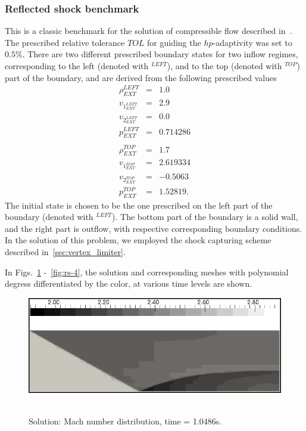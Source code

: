 \subsubsection{Reflected shock benchmark}
This is a classic benchmark for the solution of compressible flow described in~\cite{reflected}.
The prescribed relative tolerance $TOL$ for guiding the $hp$-adaptivity was set to $0.5\%$.
There are two different prescribed boundary states for two inflow regimes, corresponding to the left (denoted with $^{LEFT}$), and to the top (denoted with $^{TOP}$) part of the boundary, and are derived from the following prescribed values
\begin{eqnarray}
\rho_{EXT}^{LEFT} & = & 1.0 \\
v_{1_{EXT}^{LEFT}} & = & 2.9 \\
v_{2_{EXT}^{LEFT}} & = & 0.0 \\
p_{EXT}^{LEFT} & = & 0.714286 \\
\\
\rho_{EXT}^{TOP} & = & 1.7 \\
v_{1_{EXT}^{TOP}} & = & 2.619334 \\
v_{2_{EXT}^{TOP}} & = & -0.5063 \\
p_{EXT}^{TOP} & = & 1.52819.
\end{eqnarray}
The initial state is chosen to be the one prescribed on the left part of the boundary (denoted with $^{LEFT}$).
The bottom part of the boundary is a solid wall, and the right part is outflow, with respective corresponding boundary conditions.
In the solution of this problem, we employed the shock capturing scheme described in~\ref{sec:vertex_limiter}.

In Figs.~\ref{fig:rs-1} -~\ref{fig:rs-4}, the solution and corresponding meshes with polynomial degress differentiated by the color, at various time levels are shown.

\begin{figure}[H]
\begin{center}
\includegraphics[width=\textwidth]{examples_img/reflected-shock/rs_sln.png}\ \ \ 
\end{center}

\caption{Solution: Mach number distribution, time = 1.0486s.}

\label{fig:rs-1}
\end{figure}

